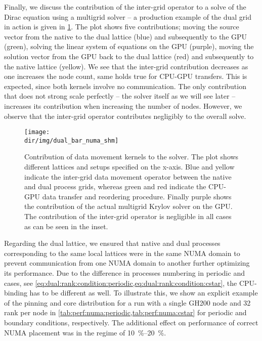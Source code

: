 Finally, we discuss the contribution of the inter-grid operator to a solve of the Dirac equation using a multigrid solver -- a production example of the dual grid in action is given in \cref{fig:dual:bar}.
The plot shows five contributions; moving the source vector from the native to the dual lattice (blue) and subsequently to the GPU (green), solving the linear system of equations on the GPU (purple), moving the solution vector from the GPU back to the dual lattice (red) and subsequently to the native lattice (yellow).
We see that the inter-grid contribution decreases as one increases the node count, same holds true for CPU-GPU transfers.
This is expected, since both kernels involve no communication.
The only contribution that does not strong scale perfectly -- the solver itself as we will see later -- increases its contribution when increasing the number of nodes.
However, we observe that the inter-grid operator contributes negligibly to the overall solve.
\begin{figure}
    \centering
    \texttt{[image: \\dir/img/dual\_bar\_numa\_shm]}
    \caption{Contribution of data movement kernels to the solver. The plot shows different lattices and setups specified on the x-axis. Blue and yellow indicate the inter-grid data movement operator between the native and dual process grids, whereas green and red indicate the CPU-GPU data transfer and reordering procedure. Finally purple shows the contribution of the actual multigrid Krylov solver on the GPU. The contribution of the inter-grid operator is negligible in all cases as can be seen in the inset. }
    \label{fig:dual:bar}
\end{figure}

Regarding the dual lattice, we ensured that native and dual processes corresponding to the same local lattices were in the same NUMA domain to prevent communication from one NUMA domain to another further optimizing its performance.
Due to the difference in processes numbering in periodic and \Cstar cases, see \cref{eq:dual:rank:condition:periodic,eq:dual:rank:condition:cstar}, the CPU-binding has to be different as well.
To illustrate this, we show an explicit example of the pinning and core distribution for a run with a single GH200 node and \num{32} rank per node in \cref{tab:perf:numa:periodic,tab:perf:numa:cstar} for periodic and \Cstar boundary conditions, respectively.
The additional effect on performance of correct NUMA placement was in the regime of \SIrange{10}{20}{\percent}.


